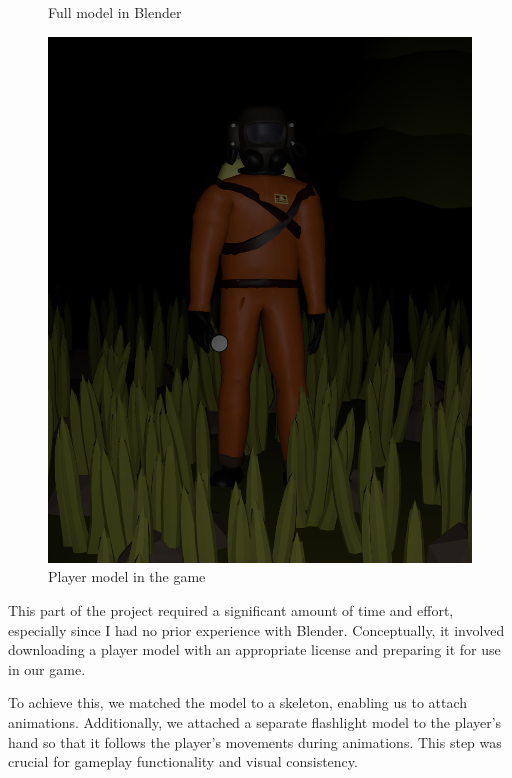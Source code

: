\documentclass[11pt]{article}
\begin{document}
\begin{figure}[h]
\begin{minipage}{0.3\textwidth}
        \caption{Full model in Blender}
    \end{minipage}
    \hfill
    \begin{minipage}{0.3\textwidth}
        \centering
        \includegraphics[width=\textwidth]{playerGame}
        \caption{Player model in the game}
    \end{minipage}
\end{figure}


\par This part of the project required a significant amount of time and effort, especially since I had no prior experience with Blender. Conceptually, it involved downloading a player model with an appropriate license and preparing it for use in our game.

\par To achieve this, we matched the model to a skeleton, enabling us to attach animations. Additionally, we attached a separate flashlight model to the player’s hand so that it follows the player’s movements during animations. This step was crucial for gameplay functionality and visual consistency.
\end{document}
